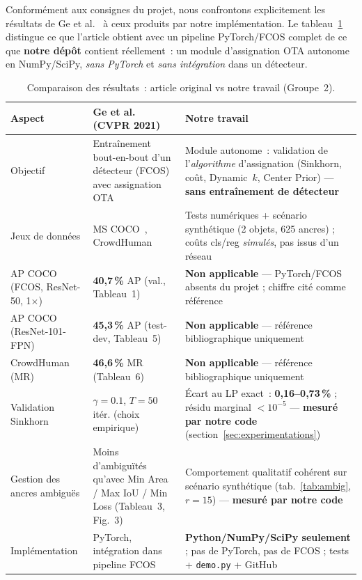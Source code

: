 \documentclass[11pt,a4paper]{article}
\begin{document}
Conformément aux consignes du projet, nous confrontons explicitement les résultats de Ge et al.~\cite{ge2021ota} à ceux produits par notre implémentation. Le tableau~\ref{tab:compare} distingue ce que l'article obtient avec un pipeline PyTorch/FCOS complet de ce que \textbf{notre dépôt} contient réellement~: un module d'assignation OTA autonome en NumPy/SciPy, \emph{sans PyTorch} et \emph{sans intégration} dans un détecteur.

\begin{table}[h]
\centering
\small
\caption{Comparaison des résultats~: article original vs notre travail (Groupe~2).}
\label{tab:compare}
\begin{tabular}{@{}p{2.8cm}p{4.9cm}p{4.9cm}@{}}
\toprule
\textbf{Aspect} & \textbf{Ge et al. (CVPR 2021)} & \textbf{Notre travail} \\
\midrule
Objectif &
Entraînement bout-en-bout d'un détecteur (FCOS) avec assignation OTA &
Module autonome~: validation de l'\emph{algorithme} d'assignation (Sinkhorn, coût, Dynamic~$k$, Center Prior) --- \textbf{sans entraînement de détecteur} \\
\addlinespace
Jeux de données &
MS COCO~\cite{lin2014coco}, CrowdHuman~\cite{shao2018crowdhuman} &
Tests numériques + scénario synthétique (2 objets, 625 ancres) ; coûts cls/reg \emph{simulés}, pas issus d'un réseau \\
\addlinespace
AP COCO (FCOS, ResNet-50, 1$\times$) &
\textbf{40,7\,\%} AP (val., Tableau~1) &
\textbf{Non applicable} --- PyTorch/FCOS absents du projet ; chiffre cité comme référence \\
\addlinespace
AP COCO (ResNet-101-FPN) &
\textbf{45,3\,\%} AP (test-dev, Tableau~5) &
\textbf{Non applicable} --- référence bibliographique uniquement \\
\addlinespace
CrowdHuman (MR) &
\textbf{46,6\,\%} MR (Tableau~6) &
\textbf{Non applicable} --- référence bibliographique uniquement \\
\addlinespace
Validation Sinkhorn &
$\gamma=0.1$, $T=50$ itér. (choix empirique) &
Écart au LP exact~: \textbf{0,16--0,73\,\%} ; résidu marginal $<10^{-5}$ --- \textbf{mesuré par notre code} (section~\ref{sec:experimentations}) \\
\addlinespace
Gestion des ancres ambiguës &
Moins d'ambiguïtés qu'avec Min Area / Max IoU / Min Loss (Tableau~3, Fig.~3) &
Comportement qualitatif cohérent sur scénario synthétique (tab.~\ref{tab:ambig}, $r=15$) --- \textbf{mesuré par notre code} \\
\addlinespace
Implémentation &
PyTorch, intégration dans pipeline FCOS &
\textbf{Python/NumPy/SciPy seulement} ; pas de PyTorch, pas de FCOS ; tests + \texttt{demo.py} + GitHub \\
\bottomrule
\end{tabular}
\end{table}
\end{document}
